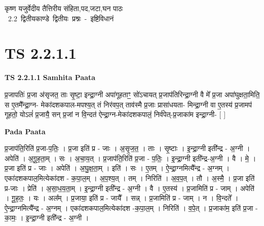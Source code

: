 \documentclass[17pt]{extarticle}
\begin{document}
\begin{titlepage}
    \begin{center}
 
\begin{sanskrit}
    { \Large
    कृष्ण यजुर्वेदीय तैत्तिरीय संहिता,पद,जटा,घन पाठः 
    }
    \\
    \vspace{2.5cm}
    \mbox{ \Large
    2.2     द्वितीयकाण्डे द्वितीयः प्रश्नः - इष्टिविधानं   }
\end{sanskrit}
\end{center}

\end{titlepage}
\tableofcontents
{}
\pagebreak


\section{ TS 2.2.1.1 }

\textbf{TS 2.2.1.1 } \newline
\textbf{Samhita Paata} \newline

प्र॒जापतिः॑ प्र॒जा अ॑सृजत॒ ताः सृ॒ष्टा॒ इन्द्रा॒ग्नी अपा॑गूहताꣳ॒॒ सो॑ऽचायत् प्र॒जाप॑तिरिन्द्रा॒ग्नी वै मे᳚ प्र॒जा अपा॑घुक्षता॒मिति॒ स ए॒तमै᳚न्द्रा॒ग्न- मेका॑दशकपाल-मपश्य॒त् तं निर॑वप॒त् ताव॑स्मै प्र॒जाः प्रासा॑धयता- मिन्द्रा॒ग्नी वा ए॒तस्य॑ प्र॒जामप॑ गूहतो॒ योऽलं॑ प्र॒जायै॒ सन् प्र॒जां न वि॒न्दत॑ ऐन्द्रा॒ग्न-मेका॑दशकपालं॒ निर्व॑पेत्-प्र॒जाका॑म इन्द्रा॒ग्नी-  [  ] \newline

\textbf{Pada Paata} \newline

प्र॒जाप॑ति॒रिति॑ प्र॒जा-प॒तिः॒ । प्र॒जा इति॑ प्र - जाः । अ॒सृ॒ज॒त॒ । ताः । सृ॒ष्टाः । इ॒न्द्रा॒ग्नी इती᳚न्द्र - अ॒ग्नी । अपेति॑ । अ॒गू॒ह॒ता॒म् । सः । अ॒चा॒य॒त् । प्र॒जाप॑ति॒रिति॑ प्र॒जा - प॒तिः॒ । इ॒न्द्रा॒ग्नी इती᳚न्द्र-अ॒ग्नी । वै । मे॒ । प्र॒जा इति॑ प्र - जाः । अपेति॑ । अ॒घु॒क्ष॒ता॒म् । इति॑ । सः । ए॒तम् । ऐ॒न्द्रा॒ग्नमित्यै᳚न्द्र - अ॒ग्नम् । एका॑दशकपाल॒मित्येका॑दश - क॒पा॒ल॒म् । अ॒प॒श्य॒त् । तम् । निरिति॑ । अ॒व॒प॒त् । तौ । अ॒स्मै॒ । प्र॒जा इति॑ प्र-जाः । प्रेति॑ । अ॒सा॒ध॒य॒ता॒म् । इ॒न्द्रा॒ग्नी इती᳚न्द्र - अ॒ग्नी । वै । ए॒तस्य॑ । प्र॒जामिति॑ प्र - जाम् । अपेति॑ । गू॒ह॒तः॒ । यः । अल᳚म् । प्र॒जाया॒ इति॑ प्र - जायै᳚ । सन्न् । प्र॒जामिति॑ प्र - जाम् । न । वि॒न्दते᳚ । ऐ॒न्द्रा॒ग्नमित्यै᳚न्द्र - अ॒ग्नम् । एका॑दशकपाल॒मित्येका॑दश -क॒पा॒ल॒म् । निरिति॑ । व॒पे॒त् । प्र॒जाका॑म॒ इति॑ प्र॒जा - का॒मः॒ । इ॒न्द्रा॒ग्नी इती᳚न्द्र - अ॒ग्नी ।  \newline
\end{document}
